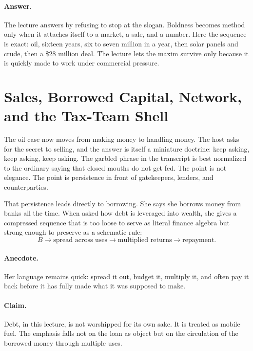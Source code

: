 \paragraph{Answer.}
The lecture answers by refusing to stop at the slogan. Boldness becomes method only when it attaches itself to a market, a sale, and a number. Here the sequence is exact: oil, sixteen years, six to seven million in a year, then solar panels and crude, then a \(\$28\) million deal. The lecture lets the maxim survive only because it is quickly made to work under commercial pressure.

\section{Sales, Borrowed Capital, Network, and the Tax-Team Shell}

The oil case now moves from making money to handling money. The host asks for the secret to selling, and the answer is itself a miniature doctrine: keep asking, keep asking, keep asking. The garbled phrase in the transcript is best normalized to the ordinary saying that closed mouths do not get fed. The point is not elegance. The point is persistence in front of gatekeepers, lenders, and counterparties.

That persistence leads directly to borrowing. She says she borrows money from banks all the time. When asked how debt is leveraged into wealth, she gives a compressed sequence that is too loose to serve as literal finance algebra but strong enough to preserve as a schematic rule:
\begin{equation}
B
\to
\text{spread across uses}
\to
\text{multiplied returns}
\to
\text{repayment}.
\end{equation}

\paragraph{Anecdote.}
Her language remains quick: spread it out, budget it, multiply it, and often pay it back before it has fully made what it was supposed to make.

\paragraph{Claim.}
Debt, in this lecture, is not worshipped for its own sake. It is treated as mobile fuel. The emphasis falls not on the loan as object but on the circulation of the borrowed money through multiple uses.

